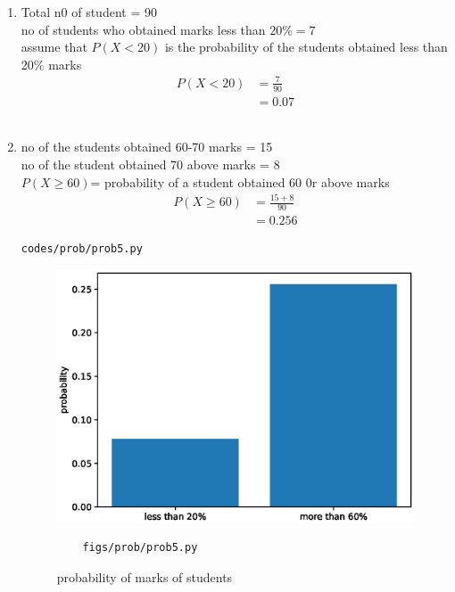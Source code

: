 \renewcommand{\theequation}{\theenumi}
\begin{enumerate}[label=\arabic*.,ref=\thesubsection.\theenumi]
\item Total n0 of student = 90
\\
no of students who obtained marks less than $20\%= 7$
\\
assume that $P(X<20)$ is the probability of the students obtained less than 20$\%$ marks 
\begin{align}
	P\left(X<20\right) &= \frac{7}{90}
	\\
	&=0.07
\end{align}
\\
\item no of the students obtained 60-70 marks = 15
\\
no of the student obtained 70 above marks = 8
\\
$P(X \geq 60)$= probability of a student obtained 60 0r above marks 
\begin{align}
P\left(X \geq 60\right) &= \frac{15 + 8}{90}
\\
&= 0.256
\end{align}
\begin{lstlisting}
codes/prob/prob5.py
\end{lstlisting}
\begin{figure}[!ht]
	\centering
	\includegraphics[width=\columnwidth]{./figures/prob/prob5.eps}
	\caption{probability of marks of students }
	\label{fig:bt5}
	\begin{lstlisting}
	figs/prob/prob5.py
	\end{lstlisting}
\end{figure}
\end{enumerate}